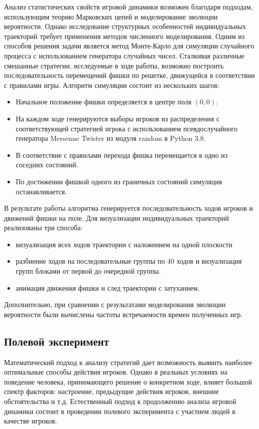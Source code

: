 Анализ статистических свойств игровой динамики возможен благодаря подходам, использующим теорию Марковских цепей
и моделирование эволюции вероятности. Однако исследование структурных особенностей индивидуальных траекторий 
требует применения методов численного моделирования. Одним из способов решения задачи является метод Монте-Карло
для симуляции случайного процесса с использованием генератора случайных чисел. Сталкивая различные смешанные стратегии,
исследуемые в ходе работы, возможно построить последовательность перемещений фишки по решетке, движущейся в соответствии
с правилами игры. Алгоритм симуляции состоит из нескольких шагов:
\begin{itemize}
\item Начальное положение фишки определяется в центре поля $(0, 0)$. 
\item На каждом ходе генерируются выборы игроков из распределения с соответствующей стратегией игрока
с использованием псевдослучайного генератора Mersenne Twister из модуля random в Python 3.8.
\item В соответствие с правилами перехода фишка перемещается в одно из соседних состояний.
\item По достижении фишкой одного из граничных состояний симуляция останавливается.
\end{itemize}

В результате работы алгоритма генерируется последовательность ходов игроков и движений фишки на поле.
Для визуализации индивидуальных траекторий реализованы три способа: 
\begin{itemize}
\item визуализация всех ходов траектории с наложением на одной плоскости
\item разбиение ходов на последовательные группы по 40 ходов и визуализация групп блоками от первой до очередной группы.
\item анимация движения фишки и след траектории с затуханием.
\end{itemize}

Дополнительно, при сравнении с результатами моделирования эволюции вероятности были вычислены частоты
встречаемости времен полученных игр. 

\subsection{Полевой эксперимент}\label{subsec:ch1/sec3/sub6}

Математический подход к анализу стратегий дает возможность выявить наиболее оптимальные 
способы действия игроков. Однако в реальных условиях на поведение человека, принимающего решение
о конкретном ходе, влияет большой спектр факторов: настроение, предыдущие действия игроков, внешние обстоятельства и т.д.
Естественный подход к продолжению анализа игровой динамики состоит в проведении полевого эксперимента
с участием людей в качестве игроков. 

